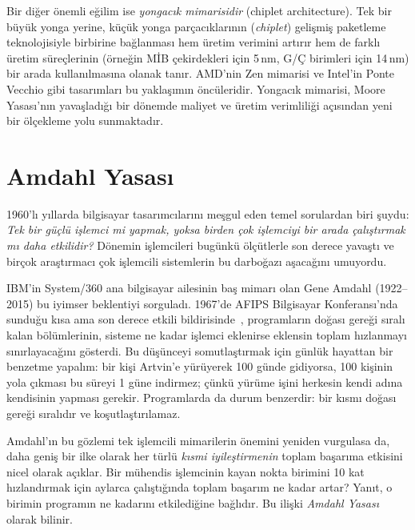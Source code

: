 Bir diğer önemli eğilim ise \emph{yongacık mimarisidir} (chiplet architecture). Tek bir büyük yonga yerine, küçük yonga parçacıklarının (\emph{chiplet}) gelişmiş paketleme teknolojisiyle birbirine bağlanması hem üretim verimini artırır hem de farklı üretim süreçlerinin (örneğin MİB çekirdekleri için 5\,nm, G/Ç birimleri için 14\,nm) bir arada kullanılmasına olanak tanır. AMD'nin Zen mimarisi ve Intel'in Ponte Vecchio gibi tasarımları bu yaklaşımın öncüleridir. Yongacık mimarisi, Moore Yasası'nın yavaşladığı bir dönemde maliyet ve üretim verimliliği açısından yeni bir ölçekleme yolu sunmaktadır.


\section{Amdahl Yasası}
\label{sec:amdahl}

1960'lı yıllarda bilgisayar tasarımcılarını meşgul eden temel sorulardan biri şuydu: \emph{Tek bir güçlü işlemci mi yapmak, yoksa birden çok işlemciyi bir arada çalıştırmak mı daha etkilidir?} Dönemin işlemcileri bugünkü ölçütlerle son derece yavaştı ve birçok araştırmacı çok işlemcili sistemlerin bu darboğazı aşacağını umuyordu.

IBM'in System/360 ana bilgisayar ailesinin baş mimarı olan Gene Amdahl (1922--2015) bu iyimser beklentiyi sorguladı. 1967'de AFIPS Bilgisayar Konferansı'nda sunduğu kısa ama son derece etkili bildirisinde~\cite{amdahl1967}, programların doğası gereği sıralı kalan bölümlerinin, sisteme ne kadar işlemci eklenirse eklensin toplam hızlanmayı sınırlayacağını gösterdi. Bu düşünceyi somutlaştırmak için günlük hayattan bir benzetme yapalım: bir kişi Artvin'e yürüyerek 100 günde gidiyorsa, 100 kişinin yola çıkması bu süreyi 1 güne indirmez; çünkü yürüme işini herkesin kendi adına kendisinin yapması gerekir. Programlarda da durum benzerdir: bir kısmı doğası gereği sıralıdır ve koşutlaştırılamaz.

Amdahl'ın bu gözlemi tek işlemcili mimarilerin önemini yeniden vurgulasa da, daha geniş bir ilke olarak her türlü \emph{kısmi iyileştirmenin} toplam başarıma etkisini nicel olarak açıklar. Bir mühendis işlemcinin kayan nokta birimini 10 kat hızlandırmak için aylarca çalıştığında toplam başarım ne kadar artar? Yanıt, o birimin programın ne kadarını etkilediğine bağlıdır. Bu ilişki \emph{Amdahl Yasası} olarak bilinir.

